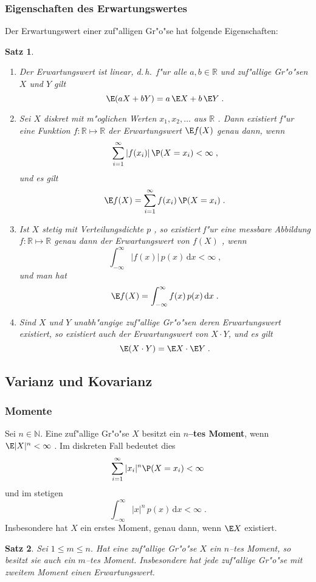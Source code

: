 \documentclass[ngerman,draft,parskip=half,twoside]{scrartcl}
\newtheorem{thm}{Satz}[section]
\newcommand*{\R}{\mathbb{R}}      %
\newcommand*{\N}{\mathbb{N}}      %
\begin{document}
\subsubsection{Eigenschaften des Erwartungswertes}
Der Erwartungswert einer zuf"alligen Gr"o"se hat folgende Eigenschaften$\colon$
\begin{thm}~
\begin{enumerate}
\item
Der Erwartungswert ist linear, d.\,h.~f"ur alle $a,b\in\R$ und zuf"allige Gr"o"sen $X$ und $Y$
gilt
$$
\E(a X+ b Y) = a\,\E X + b\, \E Y\;.
$$
\item
Sei  $X$ diskret mit m"oglichen Werten $x_1,x_2,\ldots$ aus $\R$ .
Dann existiert f"ur eine Funktion $f \colon\R\mapsto\R$
der Erwartungswert $\E f(X)$ genau dann, wenn
$$
\sum_{i=1}^\infty |f(x_i)|\,\P(X=x_i)<\infty\;,
$$
und es gilt
$$
\E f(X)=\sum_{i=1}^\infty f(x_i)\,\P(X=x_i)\;.
$$
\item
Ist $X$ stetig mit Verteilungsdichte $p$ , so existiert f"ur eine messbare
Abbildung $f \colon\R\mapsto\R$ genau dann der Erwartungswert von $f(X)$ , wenn
$$
\int_{-\infty}^\infty |f(x)|\,p(x)\,\mathrm d x<\infty\;,
$$
und man hat
$$
\E f(X)=\int_{-\infty}^\infty  f(x) \,p(x)\,\mathrm d x\;.
$$
\item
Sind $X$ und $Y$ unabh"angige zuf"allige Gr"o"sen deren Erwartungswert existiert,
so existiert auch der Erwartungswert von $X\cdot Y$, und es gilt
$$
\E(X\cdot Y)= \E X \cdot \E Y\;.
$$
\end{enumerate}
\end{thm}

\subsection{Varianz und Kovarianz}
\subsubsection{Momente}
Sei $n\in\N$. Eine zuf"allige Gr"o"se $X$ besitzt ein \textbf{$n$--tes Moment}, wenn
$\E|X|^n<\infty$ . Im diskreten Fall bedeutet dies
$$
\sum_{i=1}^\infty |x_i|^n\P(X=x_i)<\infty
$$
und im stetigen
$$
\int_{-\infty}^\infty |x|^n\,p(x)\,\mathrm d x<\infty\;.
$$
Insbesondere hat $X$ ein erstes Moment, genau dann, wenn $\E X$ existiert.
\begin{thm}
Sei $1\le m\le n$. Hat eine zuf"allige Gr"o"se $X$ ein $n$--tes Moment, so besitzt sie auch ein $m$--tes Moment.
Insbesondere hat jede zuf"allige Gr"o"se mit zweitem Moment einen Erwartungswert.
\end{thm}
\end{document}
